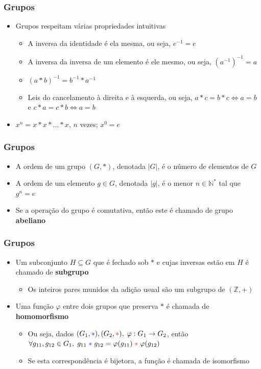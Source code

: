 \documentclass[12pt]{beamer}
\begin{document}
\begin{frame}
  \frametitle{Grupos}
  \begin{itemize}
    \item<1-> Grupos respeitam várias propriedades intuitivas
    \begin{itemize}[itemsep=0pt]
      \item<2-> A inversa da identidade é ela mesma, ou seja, $e^{-1} = e$
      \item<3-> A inversa da inversa de um elemento é ele mesmo, ou seja,
          ${(a^{-1})}^{-1} = a$
      \item<4-> $(a * b)^{-1} = b^{-1} * a^{-1}$
      \item<5-> Leis do cancelamento à direita e à esquerda, ou seja, $a * c = b *
          c \Leftrightarrow a = b$ e $c * a = c * b \Leftrightarrow a = b$
    \end{itemize}
    \item<6-> $x^{n} = x * x * \dots * x$, $n$ vezes; $x^{0} = e$
  \end{itemize}
\end{frame}

\begin{frame}
  \frametitle{Grupos}
  \begin{itemize}
    \item A ordem de um grupo $(G, *)$, denotada $|G|$, é o número de elementos
        de $G$
    \item A ordem de um elemento $g \in G$, denotada $|g|$, é o menor $n \in
        \mathbb{N}^{*}$ tal que $g^{n} = e$
    \item<2-> Se a operação do grupo é comutativa, então este é chamado de
        grupo \textbf{abeliano}
  \end{itemize}
\end{frame}

\begin{frame}
  \frametitle{Grupos}
  \begin{itemize}
    \item<1-> Um subconjunto $H \subseteq G$ que é fechado sob $*$ e
        cujas inversas estão em $H$ é chamado de \textbf{subgrupo}
    \begin{itemize}
      \item Os inteiros pares munidos da adição usual são um subgrupo de
          $(\mathbb{Z}, +)$
    \end{itemize}
    \item<2-> Uma função $\varphi$ entre dois grupos que preserva $*$ é chamada
        de \textbf{homomorfismo}
    \begin{itemize}[itemsep=0pt]
      \item Ou seja, dados $(G_{1}, {\color{blue}*}), (G_{2},
          {\color{red}*}),\; \varphi : G_{1} \rightarrow G_{2}$, então $\forall
            g_{11}, g_{12} \in G_{1},\; g_{11}\; {\color{blue}*}\; g_{12} =
            \varphi(g_{11})\; {\color{red}*}\; \varphi(g_{12})$
      \item<3-> Se esta correspondência é bijetora, a função é chamada de
          isomorfismo
    \end{itemize}
  \end{itemize}
\end{frame}
\end{document}
